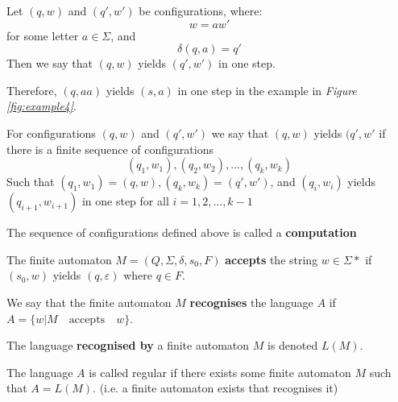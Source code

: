 \documentclass[11pt]{article}
\begin{document}
Let $(q, w)$ and $(q', w')$ be configurations, where:
$$w = aw'$$
for some letter $a \in \Sigma$, and
$$\delta(q, a) = q'$$
Then we say that $(q, w)$ yields $(q', w')$ in one step.

Therefore, $(q, aa)$ yields $(s, a)$ in one step in the example in \emph{Figure
	\ref{fig:example4}}.

For configurations $(q, w)$ and $(q', w')$ we say that $(q, w)$ yields $(q', w'$
if there is a finite sequence of configurations
$$(q_1, w_1), (q_2, w_2), ..., (q_k, w_k)$$
Such that $(q_1, w_1)=(q,w), (q_k, w_k)=(q',w')$, and
$(q_i, w_i)$ yields $(q_{i+1}, w_{i+1})$ in one step for all $i=1, 2, ..., k-1$

The sequence of configurations defined above is called a \textbf{computation}

The finite automaton $M=(Q, \Sigma, \delta, s_0, F)$ \textbf{accepts} the string
$w \in \Sigma\ast$ if $(s_0, w)$ yields $(q, \varepsilon)$ where $q \in F$.

We say that the finite automaton $M$ \textbf{recognises} the language $A$ if
$A=\{w|M \quad \mathrm{accepts} \quad w\}$.

The language \textbf{recognised by} a finite automaton $M$ is denoted $L(M)$.

The language $A$ is called regular if there exists some finite automaton $M$
such that $A = L(M)$. (i.e. a finite automaton exists that recognises it)
\end{document}

